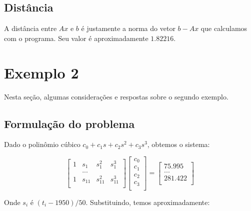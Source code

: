 \documentclass[12pt,a4paper]{article}
\begin{document}
\subsection{Distância}
A distância entre $Ax$ e $b$ é justamente a norma do vetor $b-Ax$ que calculamos com o programa.
Seu valor é aproximadamente $1.82216$.

\pagebreak
\section{Exemplo 2}
Nesta seção, algumas considerações e respostas sobre o segundo exemplo.
\subsection{Formulação do problema}
Dado o polinômio cúbico $c_0 + c_1s + c_2s^2 + c_3s^3$, obtemos o sistema:

\[
\left[
\begin{array}{cccc}
    1 & s_1 & s_{1}^{2} & s_{1}^{3} \\
      & ... \\
    1 & s_{11} & s_{11}^{2} & s_{11}^{3} \\
\end{array}
\right]
\left[
\begin{array}{c}
    c_0 \\
    c_1 \\
    c_2 \\
    c_3 \\
\end{array}
\right]
=
\left[
\begin{array}{c}
    75.995 \\
    ... \\
    281.422 \\
\end{array}
\right]
\]

Onde $s_i$ é $(t_i-1950)/50$. Substituindo, temos aproximadamente:
\end{document}
